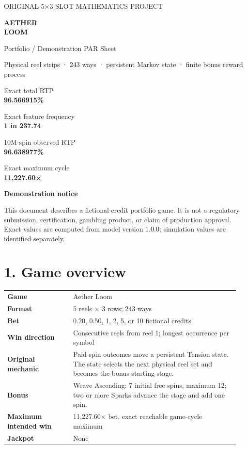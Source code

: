 \documentclass[10pt]{article}
\newcommand{\sectionbar}[1]{\vspace{8pt}{\color{acid}\rule{\linewidth}{1.5pt}}\vspace{-5pt}\section*{#1}}
\newcommand{\metric}[2]{\begin{minipage}[t]{0.47\linewidth}\colorbox{soft}{\parbox{0.94\linewidth}{\small #1\\[2pt]{\Large\bfseries #2}}}\end{minipage}}
\begin{document}
\begin{titlepage}
\color{ink}
\vspace*{1.1in}
{\small\ttfamily ORIGINAL 5×3 SLOT MATHEMATICS PROJECT}\par
\vspace{0.3in}
{\fontsize{46}{48}\selectfont\bfseries AETHER\\LOOM}\par
\vspace{0.22in}{\color{acid}\rule{2.3in}{5pt}}\par
\vspace{0.5in}
{\Large Portfolio / Demonstration PAR Sheet}\par
\vspace{0.2in}
{\large Physical reel strips · 243 ways · persistent Markov state · finite bonus reward process}\par
\vfill
\metric{Exact total RTP}{96.566915\%}\hfill\metric{Exact feature frequency}{1 in 237.74}\par\vspace{12pt}
\metric{10M-spin observed RTP}{96.638977\%}\hfill\metric{Exact maximum cycle}{11,227.60×}\par
\vfill
{\small\bfseries Demonstration notice}\par
{\small This document describes a fictional-credit portfolio game. It is not a regulatory submission, certification, gambling product, or claim of production approval. Exact values are computed from model version 1.0.0; simulation values are identified separately.}
\end{titlepage}

\sectionbar{1. Game overview}
\begin{tabular}{>{\bfseries}p{0.27\linewidth}p{0.68\linewidth}}
Game & Aether Loom \\
Format & 5 reels × 3 rows; 243 ways \\
Bet & 0.20, 0.50, 1, 2, 5, or 10 fictional credits \\
Win direction & Consecutive reels from reel 1; longest occurrence per symbol \\
Original mechanic & Paid-spin outcomes move a persistent Tension state. The state selects the next physical reel set and becomes the bonus starting stage. \\
Bonus & Weave Ascending: 7 initial free spins, maximum 12; two or more Sparks advance the stage and add one spin. \\
Maximum intended win & 11,227.60× bet, exact reachable game-cycle maximum \\
Jackpot & None \\
\end{tabular}
\end{document}
